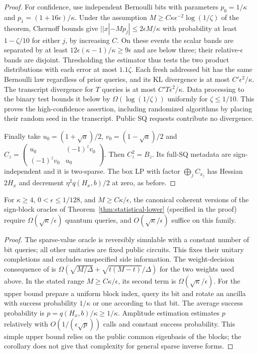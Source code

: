 \begin{proof}
For confidence, use independent Bernoulli bits with parameters
$p_0=1/\kappa$ and $p_1=(1+16\epsilon)/\kappa$.
Under the assumption $M\geq C\kappa\epsilon^{-2}\log(1/\zeta)$ of the
theorem, Chernoff bounds give
$||x|-Mp_j|\leq2\epsilon M/\kappa$ with probability at least
$1-\zeta/10$ for either $j$, by increasing $C$.
On these events the scalar bands are separated by at least
$12\epsilon(\kappa-1)/\kappa\geq9\epsilon$ and are below three;
their relative-$\epsilon$ bands are disjoint. Thresholding the
estimator thus tests the two product distributions with each error
at most $1.1\zeta$. Each fresh addressed bit has the same Bernoulli
law regardless of prior queries, and its KL divergence is at most
$C'\epsilon^2/\kappa$. The transcript divergence for $T$ queries is
at most $C'T\epsilon^2/\kappa$. Data processing to the binary test
bounds it below by $\Omega(\log(1/\zeta))$ uniformly for
$\zeta\leq1/10$. This proves the high-confidence assertion, including
randomized algorithms by placing their random seed in the transcript.
Public SQ requests contribute no divergence.

Finally take $u_0=(1+\sqrt a)/2$, $v_0=(1-\sqrt a)/2$ and
$C_z=\left(\begin{smallmatrix}u_0&(-1)^zv_0\\(-1)^zv_0&u_0\end{smallmatrix}\right)$.
Then $C_z^2=B_z$. Its full-SQ metadata are sign-independent and it
is two-sparse. The box LP with factor $\bigoplus_jC_{x_j}$ has
Hessian $2H_x$ and decrement $\eta^2q(H_x,b)/2$ at zero, as before.
\end{proof}

\begin{corollary}\label{cor:coherent-counting}
For $\kappa\geq4$, $0<\epsilon\leq1/128$, and
$M\geq C\kappa/\epsilon$, the canonical coherent versions of the sign-block
oracles of Theorem~\ref{thm:statistical-lower} (specified in the proof)
require $\Omega(\sqrt\kappa/\epsilon)$ quantum
queries, and $O(\sqrt\kappa/\epsilon)$ suffice on this family.
\end{corollary}
\begin{proof}
The sparse-value oracle is reversibly simulable with a constant number
of bit queries; all other unitaries are fixed public circuits. This
fixes their unitary completions and excludes unspecified side
information.
The weight-decision consequence of
\citet[Theorem 1.1]{NayakWu1999} is
$\Omega(\sqrt{M/\Delta}+\sqrt{t(M-t)}/\Delta)$ for the two weights
used above. In the stated range $M\geq C\kappa/\epsilon$, its second term is
$\Omega(\sqrt\kappa/\epsilon)$.
For the upper bound prepare a uniform block index, query its bit and
rotate an ancilla with success probability $1/\kappa$ or one according
to that bit. The average success probability is $p=q(H_x,b)/\kappa
\geq1/\kappa$. Amplitude estimation
\citep[Theorem 12]{BrassardEtAl2002} estimates $p$ relatively with
$O(1/(\epsilon\sqrt p))$ calls and constant success probability.
This simple upper bound relies on the public common eigenbasis of the
blocks; the corollary does not give that
complexity for general sparse inverse forms.
\end{proof}

